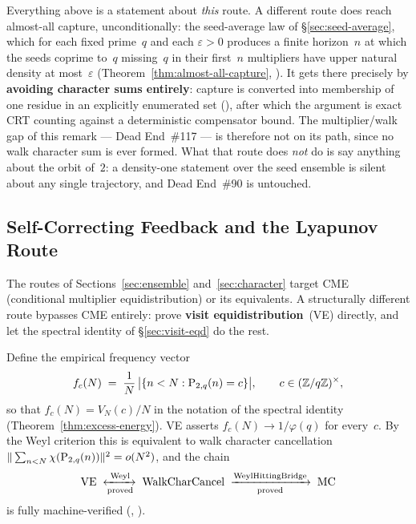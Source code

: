 \begin{remark}
Everything above is a statement about \emph{this} route.  A different
route does reach almost-all capture, unconditionally: the seed-average law
of \S\ref{sec:seed-average}, which for each fixed prime~$q$ and each
$\varepsilon>0$ produces a finite horizon~$n$ at which the seeds coprime
to~$q$ missing~$q$ in their first~$n$ multipliers have upper natural
density at most~$\varepsilon$
(Theorem~\ref{thm:almost-all-capture},
).
It gets there precisely by \textbf{avoiding character sums entirely}:
capture is converted into membership of one residue in an explicitly
enumerated set (),
after which the argument is exact CRT counting against a deterministic
compensator bound.  The multiplier/walk gap of this remark ---
Dead End~\#117 --- is therefore not on its path, since no walk character
sum is ever formed.  What that route does \emph{not} do is say anything
about the orbit of~$2$: a density-one statement over the seed ensemble is
silent about any single trajectory, and Dead End~\#90 is untouched.
\end{remark}

\subsection{Self-Correcting Feedback and the Lyapunov Route}
\label{sec:self-correcting}

The routes of Sections~\ref{sec:ensemble}
and~\ref{sec:character} target CME (conditional multiplier
equidistribution) or its equivalents.  A structurally different route
bypasses CME entirely: prove \textbf{visit equidistribution}~(VE)
directly, and let the spectral identity of \S\ref{sec:visit-eqd} do
the rest.

Define the empirical frequency vector
\[
  f_c(N) \;=\; \frac{1}{N}\,\bigl|\{n < N : \mathrm{P}_{2,q}(n) = c\}\bigr|,
  \qquad c \in (\mathbb{Z}/q\mathbb{Z})^\times,
\]
so that $f_c(N) = V_N(c)/N$ in the notation of the spectral identity
(Theorem~\ref{thm:excess-energy}).
VE asserts $f_c(N) \to 1/\varphi(q)$ for every~$c$.  By the
Weyl criterion this is equivalent to walk character cancellation
$\|\sum_{n<N} \chi(\mathrm{P}_{2,q}(n))\|^2 = o(N^2)$, and the chain
\[
  \text{VE}
  \;\xleftrightarrow[\text{proved}]{\text{Weyl}}\;
  \text{WalkCharCancel}
  \;\xrightarrow[\text{proved}]{\text{WeylHittingBridge}}\;
  \text{MC}
\]
is fully machine-verified
(, ).

